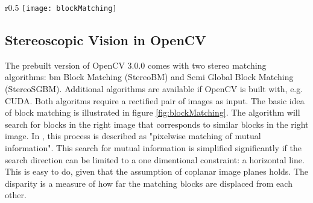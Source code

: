 \begin{wrapfigure}{r}{0.5\textwidth}
	\vspace{-10pt} %
	\centering
	\texttt{[image: blockMatching]}
	\caption{Geometry of rectified stereo vision.}
	\label{fig:blockMatching}
\end{wrapfigure}

\subsection{Stereoscopic Vision in OpenCV}

The prebuilt version of OpenCV 3.0.0 comes with two stereo matching algorithms: \gls{bm} Block Matching (StereoBM) and Semi Global Block Matching (StereoSGBM)\cite{hirschmullerstereo}. Additional algorithms are available if OpenCV is built with, e.g. CUDA. Both algoritms require a rectified pair of images as input. The basic idea of block matching is illustrated in figure \ref{fig:blockMatching}. The algorithm will search for blocks in the right image that corresponds to similar blocks in the right image. In \cite{hirschmullerstereo}, this process is described as "pixelwise matching of mutual information". This search for mutual information is simplified significantly if the search direction can be limited to a one dimentional constraint: a horizontal line. This is easy to do, given that the assumption of coplanar image planes holds. The disparity is a measure of how far the matching blocks are displaced from each other. 
